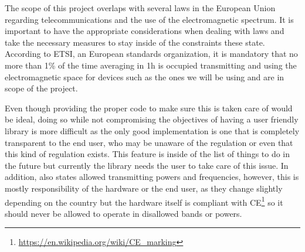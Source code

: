 The scope of this project overlaps with several laws in the European Union regarding telecommunications and the use of the electromagnetic spectrum. It is important to have the appropriate considerations when dealing with laws and take the necessary measures to stay inside of the constraints these state. According to ETSI, an European standards organization, it is mandatory that no more than 1\% of the time averaging in 1h\cite{DutyCicle} is occupied transmitting and using the electromagnetic space for devices such as the ones we will be using and are in scope of the project.

Even though providing the proper code to make sure this is taken care of would be ideal, doing so while not compromising the objectives of having a user friendly library is more difficult as the only good implementation is one that is completely transparent to the end user, who may be unaware of the regulation or even that this kind of regulation exists. This feature is inside of the list of things to do in the future but currently the library needs the user to take care of this issue. In addition, \cite{DutyCicle} also states allowed transmitting powers and frequencies, however, this is mostly responsibility of the hardware or the end user, as they change slightly depending on the country but the hardware itself is compliant with CE\footnote{\url{https://en.wikipedia.org/wiki/CE_marking}} so it should never be allowed to operate in disallowed bands or powers.
